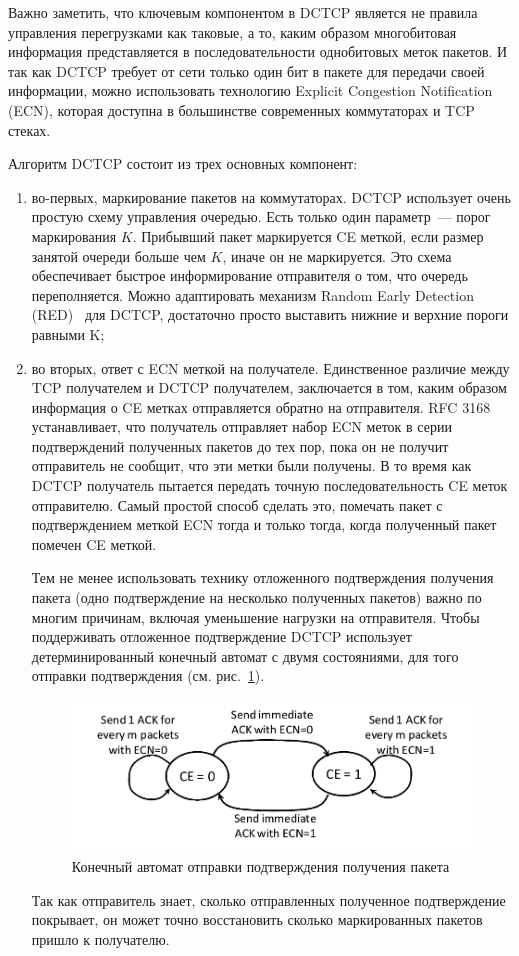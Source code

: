 \documentclass[14pt, a4paper,oneside]{extarticle}
\begin{document}
Важно заметить, что ключевым компонентом в DCTCP является не правила управления перегрузками как таковые, а то, каким образом многобитовая информация представляется в последовательности однобитовых меток пакетов. И так как DCTCP требует от сети только один бит в пакете для передачи своей информации, можно использовать технологию Explicit Congestion Notification (ECN), которая доступна в большинстве современных коммутаторах и TCP стеках.

Алгоритм DCTCP состоит из трех основных компонент:
\begin{enumerate}

\item
во-первых, маркирование пакетов на коммутаторах.
DCTCP использует очень простую схему управления очередью. Есть только один параметр~--- порог маркирования $K$. Прибывший пакет маркируется CE меткой, если размер занятой очереди больше чем $K$, иначе он не маркируется. Это схема обеспечивает быстрое информирование отправителя о том, что очередь переполняется. Можно адаптировать механизм Random Early Detection (RED)~\cite{red} для DCTCP, достаточно просто выставить нижние и верхние пороги равными K;
\item
во вторых, ответ с ECN меткой на получателе. 
Единственное различие между TCP получателем и DCTCP получателем, заключается в том, каким образом информация о CE метках отправляется обратно на отправителя. RFC 3168 устанавливает, что получатель отправляет набор ECN меток в серии подтверждений полученных пакетов до тех пор, пока он не получит отправитель не сообщит, что эти метки были получены.
В то время как DCTCP получатель пытается передать точную последовательность CE меток отправителю. Самый простой способ сделать это, помечать пакет с подтверждением меткой ECN тогда и только тогда, когда полученный пакет помечен CE меткой.

Тем не менее использовать технику отложенного подтверждения получения пакета (одно подтверждение на несколько полученных пакетов) важно по многим причинам, включая уменьшение нагрузки на отправителя. Чтобы поддерживать отложенное подтверждение DCTCP использует детерминированный конечный автомат с двумя состояниями, для того отправки подтверждения (см. рис.~\ref{state_machine}).
\begin{figure}
\includegraphics[width=\linewidth]{state_machine.png}
\caption{Конечный автомат отправки подтверждения получения пакета}
\label{state_machine}
\end{figure}
Так как отправитель знает, сколько отправленных полученное подтверждение покрывает, он может точно восстановить сколько маркированных пакетов пришло к получателю.


\end{enumerate}
\end{document}
